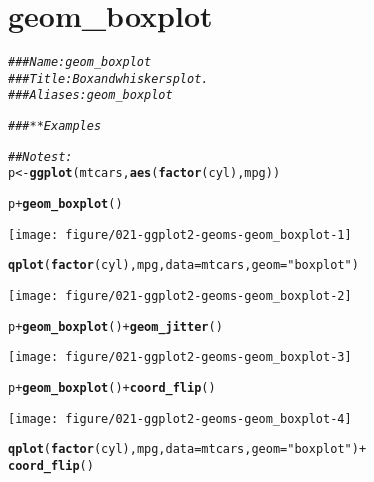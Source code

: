 \documentclass[a4paper,titlepage]{tufte-handout}\usepackage[]{graphicx}\usepackage[]{color}
\makeatletter
\def\maxwidth{ %
  \ifdim\Gin@nat@width>\linewidth
    \linewidth
  \else
    \Gin@nat@width
  \fi
}
\newcommand{\hlstr}[1]{\textcolor[rgb]{0.192,0.494,0.8}{#1}}%
\newcommand{\hlcom}[1]{\textcolor[rgb]{0.678,0.584,0.686}{\textit{#1}}}%
\newcommand{\hlopt}[1]{\textcolor[rgb]{0,0,0}{#1}}%
\newcommand{\hlstd}[1]{\textcolor[rgb]{0.345,0.345,0.345}{#1}}%
\newcommand{\hlkwb}[1]{\textcolor[rgb]{0.69,0.353,0.396}{#1}}%
\newcommand{\hlkwc}[1]{\textcolor[rgb]{0.333,0.667,0.333}{#1}}%
\newcommand{\hlkwd}[1]{\textcolor[rgb]{0.737,0.353,0.396}{\textbf{#1}}}%
\newenvironment{kframe}{%
 \def\at@end@of@kframe{}%
 \ifinner\ifhmode%
  \def\at@end@of@kframe{\end{minipage}}%
  \begin{minipage}{\columnwidth}%
 \fi\fi%
 \def\FrameCommand##1{\hskip\@totalleftmargin \hskip-\fboxsep
 \colorbox{shadecolor}{##1}\hskip-\fboxsep
     \hskip-\linewidth \hskip-\@totalleftmargin \hskip\columnwidth}%
 \MakeFramed {\advance\hsize-\width
   \@totalleftmargin\z@ \linewidth\hsize
   \@setminipage}}%
 {\par\unskip\endMakeFramed%
 \at@end@of@kframe}
\newenvironment{knitrout}{}{} %
\makeatother
\begin{document}
\section{geom\_boxplot}

\begin{knitrout}
\color{fgcolor}\begin{kframe}
\begin{alltt}
\hlcom{### Name: geom_boxplot}
\hlcom{### Title: Box and whiskers plot.}
\hlcom{### Aliases: geom_boxplot}

\hlcom{### ** Examples}

\hlcom{## No test: }
\hlstd{p} \hlkwb{<-} \hlkwd{ggplot}\hlstd{(mtcars,} \hlkwd{aes}\hlstd{(}\hlkwd{factor}\hlstd{(cyl), mpg))}

\hlstd{p} \hlopt{+} \hlkwd{geom_boxplot}\hlstd{()}
\end{alltt}
\end{kframe}
\texttt{[image: figure/021-ggplot2-geoms-geom\_boxplot-1]} 
\begin{kframe}\begin{alltt}
\hlkwd{qplot}\hlstd{(}\hlkwd{factor}\hlstd{(cyl), mpg,} \hlkwc{data} \hlstd{= mtcars,} \hlkwc{geom} \hlstd{=} \hlstr{"boxplot"}\hlstd{)}
\end{alltt}
\end{kframe}
\texttt{[image: figure/021-ggplot2-geoms-geom\_boxplot-2]} 
\begin{kframe}\begin{alltt}
\hlstd{p} \hlopt{+} \hlkwd{geom_boxplot}\hlstd{()} \hlopt{+} \hlkwd{geom_jitter}\hlstd{()}
\end{alltt}
\end{kframe}
\texttt{[image: figure/021-ggplot2-geoms-geom\_boxplot-3]} 
\begin{kframe}\begin{alltt}
\hlstd{p} \hlopt{+} \hlkwd{geom_boxplot}\hlstd{()} \hlopt{+} \hlkwd{coord_flip}\hlstd{()}
\end{alltt}
\end{kframe}
\texttt{[image: figure/021-ggplot2-geoms-geom\_boxplot-4]} 
\begin{kframe}\begin{alltt}
\hlkwd{qplot}\hlstd{(}\hlkwd{factor}\hlstd{(cyl), mpg,} \hlkwc{data} \hlstd{= mtcars,} \hlkwc{geom} \hlstd{=} \hlstr{"boxplot"}\hlstd{)} \hlopt{+}
  \hlkwd{coord_flip}\hlstd{()}
\end{alltt}
\end{kframe}

\end{knitrout}
\end{document}

